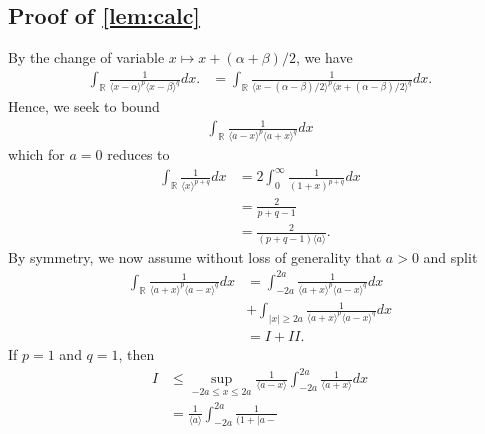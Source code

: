 \documentclass[12pt,reqno]{amsart}
\numberwithin{equation}{section}  %
\newcommand{\rr}{\mathbb{R}}
\begin{document}
\begin{appendices}
\subsection{Proof of \cref{lem:calc}}
%
By the change of variable $x \mapsto x + (\alpha + \beta)/2$, we have
%
%
\begin{equation*}
	\begin{split}
    \int_{\rr} \frac{1}{\langle x - \alpha \rangle^{p} \langle  x -
    \beta
    \rangle^{q}}d x.
    & = \int_{\rr} \frac{1}{ \langle x - (\alpha - \beta)/2  \rangle^{p}
    \langle  x + (\alpha - \beta)/2 \rangle^{q}} d x.
	\end{split}
\end{equation*}
%
%
Hence, we seek to bound
%
%
%
\begin{equation*}
\begin{split}
  \int_{\rr} \frac{1}{\langle a - x \rangle ^{p} \langle a + x \rangle
  ^{q}} d x
\end{split}
\end{equation*}
%
which for $a =0$ reduces to 
%
%
\begin{equation*}
\begin{split}
  \int_{\rr} \frac{1}{\langle x \rangle ^{p+q}} d x 
  & = 2 \int_{0}^{\infty} \frac{1}{(1 + x)^{p+q}} d x
  \\
  & = \frac{2}{p+q -1}
  \\
  & = \frac{2}{(p+q -1)\langle a \rangle }.
\end{split}
\end{equation*}
%
%
By symmetry, we now assume without loss of generality that $a > 0$ and split 
%
%
\begin{equation*}
\begin{split}
\int_{\rr} \frac{1}{\langle a + x \rangle ^{p} \langle a - x \rangle
  ^{q}} d x
  & = \int_{-2a}^{2a}
  \frac{1}{\langle a + x \rangle ^{p} \langle a - x \rangle
  ^{q}} d x
  \\
  & + \int_{| x | \ge 2a} 
\frac{1}{\langle a + x \rangle ^{p} \langle a - x \rangle
  ^{q}} d x
  \\
  & = I + II.
\end{split}
\end{equation*}
%
%
If $p=1$ and $q=1$, then 
%
%
\begin{equation*}
\begin{split}
  I
  & \le \sup_{-2a \le x \le 2a} \frac{1}{\langle a - x \rangle
  } \int_{-2a}^{2a} \frac{1}{\langle a + x \rangle } d x
  \\
  & = \frac{1}{\langle a \rangle } \int_{-2a}^{2a} \frac{1}{(1 + | a -
}
\end{split}
\end{equation*}
\end{appendices}
\end{document}
